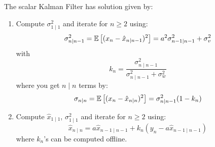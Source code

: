 \begin{theorem}
    The scalar Kalman Filter has solution given by:

    \begin{enumerate}
        \item Compute $\sigma_{1 \mid 1}^2$ and iterate for $n \geq 2$ using:
        \[ \sigma_{n \mid n - 1}^2 = \mathbb{E}\left[ (x_n - \hat{x}_{n \mid n - 1})^2 \right] = a^2 \sigma_{n - 1 \mid n - 1}^2 + \sigma_v^2 \]
        with
        \[ k_n = \frac{\sigma_{n \mid n - 1}^2}{\sigma_{n \mid n - 1}^2 + \sigma_{w}^2} \]
        where you get $n \mid n$ terms by:
        \[ \sigma_{n \mid n} = \mathbb{E}\left[ (x_n - \hat{x}_{n \mid n})^2 \right] = \sigma_{n \mid n - 1}^2 ( 1 - k_n) \]
        \item Compute $\hat{x}_{1 \mid 1}$, $\sigma_{1 \mid 1}^2$ and iterate for $n \geq 2$ using:
        \[ \hat{x}_{n \mid n} = a \hat{x}_{n - 1 \mid n - 1} + k_n (y_n - a \hat{x}_{n - 1 \mid n - 1}) \]
        where $k_n$'s can be computed offline.
    \end{enumerate}


\end{theorem}
